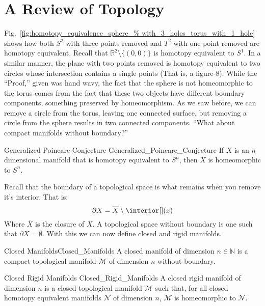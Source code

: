 \section{A Review of Topology}
    Fig.~\ref{fig:homotopy_equivalence_sphere_%
                   with_3_holes_torus_with_1_hole} shows how both
    $S^{2}$ with three points removed and $T^{2}$ with one point removed
    are homotopy equivalent. Recall that
    $\mathbb{R}^{2}\setminus \{(0,0)\}$ is homotopy equivalent to
    $S^{1}$. In a similar manner, the plane with two points removed is
    homotopy equivalent to two circles whose intersection contains a
    single points (That is, a figure-$8$). While the ``Proof,'' given
    was hand wavy, the fact that the sphere is not homeomorphic to the
    torus comes from the fact that these two objects have different
    boundary components, something preserved by homeomorphism. As we
    saw before, we can remove a circle from the torus, leaving one
    connected surface, but removing a circle from the sphere results in 
    two connected components. ``What about compact manifolds without
    boundary?''
    \begin{ltheorem}{Generalized Poincare Conjecture}
                    {Generalized_Poincare_Conjecture}
        If $X$ is an $n$ dimensional manifold that
        is homotopy equivalent to $S^{n}$, then $X$
        is homeomorphic to $S^{n}$.
    \end{ltheorem}
    \vspace{5pt}
    Recall that the boundary of a topological space
    is what remains when you remove it's interior.
    That is:
    \begin{equation}
        \partial{X}=\overline{X}\setminus\interior[](x)
    \end{equation}
    Where $\overline{X}$ is the closure of $X$.
    A topological space without boundary is one such that
    $\partial{X}=\emptyset$. With this we can now define
    closed and rigid manifolds.
    \begin{ldefinition}{Closed Manifolds}{Closed_Manifolds}
        A closed manifold of dimension $n\in\mathbb{N}$ is
        a compact topological manifold $\mathcal{M}$ of
        dimension $n$ without boundary.
    \end{ldefinition}
    \begin{ldefinition}{Closed Rigid Manifolds}
                       {Closed_Rigid_Manifolds}
        A closed rigid manifold of dimension $n$
        is a closed topological manifold $\mathcal{M}$
        such that, for all closed homotopy equivalent
        manifolds $\mathcal{N}$ of dimension $n$,
        $\mathcal{M}$ is homeomorphic to $\mathcal{N}$.
    \end{ldefinition}
